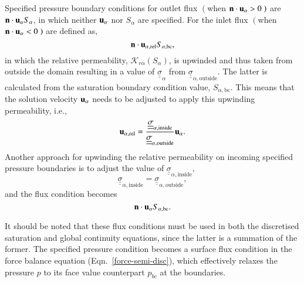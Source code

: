 \documentclass[preprint,authoryear,12pt]{elsarticle}
\begin{document}
\medskip
Specified pressure boundary conditions for outlet flux $\left(\right.$when ${\bf n}\cdot {\bf u}_\alpha>0\left.\right)$ are ${\bf n}\cdot {\bf u}_\alpha {S_\alpha}$, in which neither ${\bf u}_\alpha$ nor ${S_\alpha}$ are specified. For the inlet flux $\left(\right.$when ${\bf n}\cdot {\bf u}_\alpha<0\left.\right)$ are defined as,
\begin{displaymath}
{\bf n}\cdot {\bf u}_{\alpha,\text{rel}} S_{\alpha,\text{bc}},
\end{displaymath}
in which the relative permeability, $\mathcal{K}_{r\alpha}\left(S_{\alpha}\right)$, is upwinded and thus taken from outside the domain resulting in a value of $\underline{\underline{\sigma}}_{\alpha}$ from $\underline{\underline{\sigma}}_{\alpha,\text{outside}}$. The latter is calculated from the saturation boundary condition value, $S_{\alpha,\text{bc}}$. This means that the solution velocity ${{\bf u}_\alpha}$ needs to be adjusted to apply this upwinding permeability, i.e., 
\begin{equation}
  {\bf u}_{\alpha,\text{rel}} = \displaystyle\frac{ \underline{\underline{\sigma}}_{\alpha,\text{inside}}} { \underline{\underline{\sigma}}_{\alpha,\text{outside}}} {\bf u}_{\alpha}.
\end{equation}
Another approach for upwinding the relative permeability on incoming specified pressure boundaries is to adjust the value of $\underline{\underline{\sigma}}_{\alpha,\text{inside}}$,
\begin{displaymath}
\underline{\underline{\sigma}}_{\alpha,\text{inside}} = \underline{\underline{\sigma}}_{\alpha,\text{outside}},
\end{displaymath}
and the flux condition becomes
\begin{displaymath}
{\bf n}\cdot{\bf u}_{\alpha} S_{\alpha,\text{bc}}.
\end{displaymath}

It should be noted that these flux conditions must be used in both the discretised saturation and global continuity equations, since the latter is a summation of the former. The specified pressure condition becomes a surface flux condition in the force balance equation (Eqn.~\ref{force-semi-disc}), which effectively relaxes the pressure $p$ to its face value counterpart $p_{bc}$ at the boundaries. 

\end{document}
